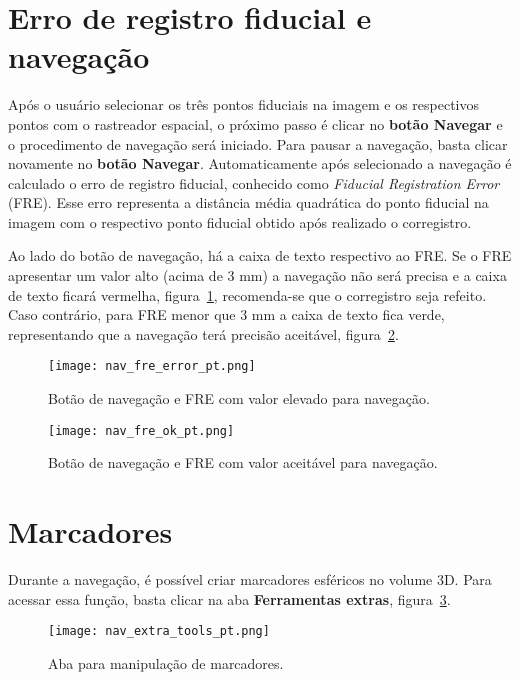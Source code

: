 \section{Erro de registro fiducial e navegação}

Após o usuário selecionar os três pontos fiduciais na imagem e os respectivos pontos com o rastreador espacial, o próximo passo é clicar no \textbf{botão Navegar} e o procedimento de navegação será iniciado. Para pausar a navegação, basta clicar novamente no \textbf{botão Navegar}. Automaticamente após selecionado a navegação é calculado o erro de registro fiducial, conhecido como \textit{Fiducial Registration Error} (FRE). Esse erro representa a distância média quadrática do ponto fiducial na imagem com o respectivo ponto fiducial obtido após realizado o corregistro. 

Ao lado do botão de navegação, há a caixa de texto respectivo ao FRE. Se o FRE apresentar um valor alto (acima de 3 mm) a navegação não será precisa e a caixa de texto ficará vermelha, figura~\ref{fig:nav_fre_error}, recomenda-se que o corregistro seja refeito. Caso contrário, para FRE menor que 3 mm a caixa de texto fica verde, representando que a navegação terá precisão aceitável, figura~\ref{fig:nav_fre_ok}.

\begin{figure}[!htb]
\centering
\texttt{[image: nav\_fre\_error\_pt.png]}
\caption{Botão de navegação e FRE com valor elevado para navegação.}
\label{fig:nav_fre_error}
\end{figure}

\begin{figure}[!htb]
\centering
\texttt{[image: nav\_fre\_ok\_pt.png]}
\caption{Botão de navegação e FRE com valor aceitável para navegação.}
\label{fig:nav_fre_ok}
\end{figure}

\section{Marcadores}

Durante a navegação, é possível criar marcadores esféricos no volume 3D. Para acessar essa função, basta clicar na aba \textbf{Ferramentas extras}, figura~\ref{fig:nav_extra_tools}.

\begin{figure}[!htb]
\centering
\texttt{[image: nav\_extra\_tools\_pt.png]}
\caption{Aba para manipulação de marcadores.}
\label{fig:nav_extra_tools}
\end{figure}

